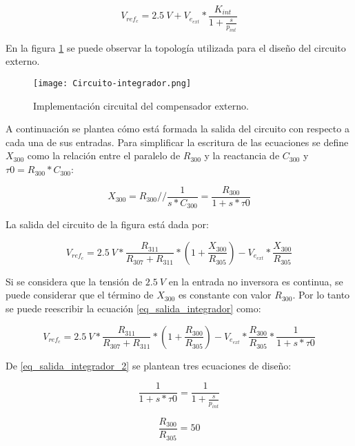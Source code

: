 \begin{equation}
	V_{ref_c}=2.5\:V+V_{e_{ext}}*\frac{K_{int}}{1+\frac{s}{p_{int}}}
\end{equation}

\noindent En la figura \ref{fig:circuito-integrador} se puede observar la topología utilizada para el diseño del circuito externo.

\begin{figure}[H]
	\centering
	\texttt{[image: Circuito-integrador.png]}
	\caption{Implementación circuital del compensador externo.}
	\label{fig:circuito-integrador}
\end{figure}

A continuación se plantea cómo está formada la salida del circuito con respecto a cada una de sus entradas. Para simplificar la escritura de las ecuaciones se define $X_{300}$ como la relación entre el paralelo de $R_{300}$ y la reactancia de $C_{300}$ y $\tau 0 = R_{300}*C_{300}$:

\begin{equation}
	X_{300} = R_{300} // \frac{1}{s*C_{300}} = \frac{R_{300}}{1+s*\tau 0}
\end{equation}

La salida del circuito de la figura está dada por:

\begin{equation} \label{eq_salida_integrador}
	V_{ref_c}=2.5\:V*\frac{R_{311}}{R_{307}+R_{311}}*(1+\frac{X_{300}}{R_{305}})-V_{e_{ext}}*\frac{X_{300}}{R_{305}}
\end{equation}

Si se considera que la tensión de $2.5\:V$ en la entrada no inversora es continua, se puede considerar que el término de $X_{300}$ es constante con valor $R_{300}$. Por lo tanto se puede reescribir la ecuación \ref{eq_salida_integrador} como:

\begin{equation} \label{eq_salida_integrador_2}
	V_{ref_c}=2.5\:V*\frac{R_{311}}{R_{307}+R_{311}}*(1+\frac{R_{300}}{R_{305}})-V_{e_{ext}}*\frac{R_{300}}{R_{305}}*\frac{1}{1+s*\tau 0}
\end{equation}

De \ref{eq_salida_integrador_2} se plantean tres ecuaciones de diseño:

\begin{equation} \label{eq_polo_integrador}
	\frac{1}{1+s*\tau 0}=\frac{1}{1+\frac{s}{p_{int}}}
\end{equation}

\begin{equation} \label{eq_ganancia_integrador}
	\frac{R_{300}}{R_{305}}=50
\end{equation}


